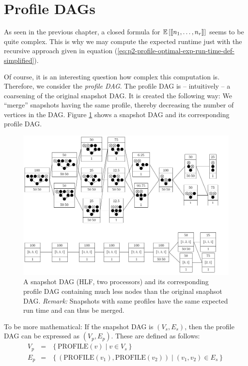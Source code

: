 
\section{Profile DAGs}
\label{sec:p2-profile-dags}

As seen in the previous chapter, a closed formula for $\mathbb{E}\left[ \left\llbracket n_1,\dots,n_r \right\rrbracket \right]$ seems to be quite complex. This is why we may compute the expected runtime just with the recursive approach given in equation (\ref{eq:p2-profile-optimal-exp-run-time-def-simplified}).

Of course, it is an interesting question how complex this computation is. Therefore, we consider the \emph{profile DAG}. The profile DAG is -- intuitively -- a coarsening of the original snapshot DAG. It is created the following way: We ``merge'' snapshots having the same profile, thereby decreasing the number of vertices in the DAG. Figure \ref{fig:p2-profile-dag-example-000111223-hlfdet} shows a snapshot DAG and its corresponding profile DAG.

\begin{figure}[t]
  \centering
  \includegraphics{p2/profile_dag_of_000111223_hlfdet.pdf}
  \caption{A snapshot DAG (HLF, two processors) and its corresponding profile DAG containing much less nodes than the original snaphsot DAG. \emph{Remark:} Snapshots with same profiles have the same expected run time and can thus be merged. }
  \label{fig:p2-profile-dag-example-000111223-hlfdet}
\end{figure}

To be more mathematical: If the snapshot DAG is $(V_s, E_s)$, then the profile DAG can be expressed as $(V_p, E_p)$. These are defined as follows:
\begin{eqnarray*}
  V_p &=& \left\{ \text{PROFILE}(v) \mid v \in V_s \right\} \\
  E_p &=& \left\{ \left(\text{PROFILE}(v_1), \text{PROFILE}(v_2) \right) \mid (v_1, v_2)\in E_s\right\}
\end{eqnarray*}

